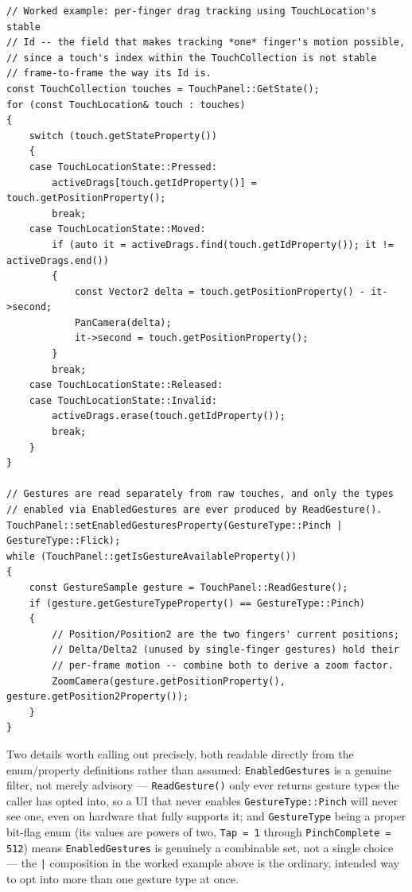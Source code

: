 \begin{lstlisting}
// Worked example: per-finger drag tracking using TouchLocation's stable
// Id -- the field that makes tracking *one* finger's motion possible,
// since a touch's index within the TouchCollection is not stable
// frame-to-frame the way its Id is.
const TouchCollection touches = TouchPanel::GetState();
for (const TouchLocation& touch : touches)
{
    switch (touch.getStateProperty())
    {
    case TouchLocationState::Pressed:
        activeDrags[touch.getIdProperty()] = touch.getPositionProperty();
        break;
    case TouchLocationState::Moved:
        if (auto it = activeDrags.find(touch.getIdProperty()); it != activeDrags.end())
        {
            const Vector2 delta = touch.getPositionProperty() - it->second;
            PanCamera(delta);
            it->second = touch.getPositionProperty();
        }
        break;
    case TouchLocationState::Released:
    case TouchLocationState::Invalid:
        activeDrags.erase(touch.getIdProperty());
        break;
    }
}

// Gestures are read separately from raw touches, and only the types
// enabled via EnabledGestures are ever produced by ReadGesture().
TouchPanel::setEnabledGesturesProperty(GestureType::Pinch | GestureType::Flick);
while (TouchPanel::getIsGestureAvailableProperty())
{
    const GestureSample gesture = TouchPanel::ReadGesture();
    if (gesture.getGestureTypeProperty() == GestureType::Pinch)
    {
        // Position/Position2 are the two fingers' current positions;
        // Delta/Delta2 (unused by single-finger gestures) hold their
        // per-frame motion -- combine both to derive a zoom factor.
        ZoomCamera(gesture.getPositionProperty(), gesture.getPosition2Property());
    }
}
\end{lstlisting}

Two details worth calling out precisely, both readable directly from the enum/property
definitions rather than assumed: \texttt{EnabledGestures} is a genuine filter, not merely
advisory --- \texttt{ReadGesture()} only ever returns gesture types the caller has opted into,
so a UI that never enables \texttt{GestureType::Pinch} will never see one, even on hardware
that fully supports it; and \texttt{GestureType} being a proper bit-flag enum (its values are
powers of two, \texttt{Tap = 1} through \texttt{PinchComplete = 512}) means
\texttt{EnabledGestures} is genuinely a combinable set, not a single choice --- the
\texttt{|} composition in the worked example above is the ordinary, intended way to opt into
more than one gesture type at once.

